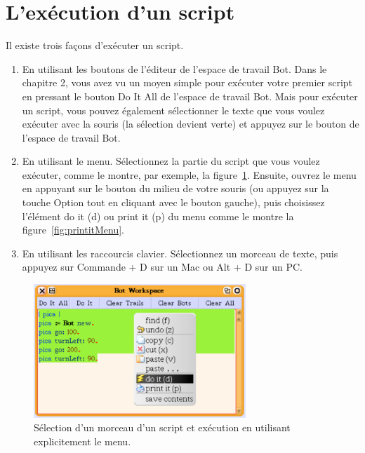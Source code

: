 \documentclass[a4paper,10pt,twoside]{book}
\begin{document}
\section{L'ex\'ecution d'un script }
Il existe trois fa\c cons d'ex\'ecuter un script.  

\begin{enumerate}
\item En utilisant les boutons de l'\'editeur de l'espace de travail Bot. Dans le chapitre 2, vous avez vu un moyen simple pour ex\'ecuter votre premier script en pressant le bouton Do It All de l'espace de travail Bot. Mais pour ex\'ecuter un script, vous pouvez \'egalement s\'electionner le texte que vous voulez ex\'ecuter avec la souris (la s\'election devient verte) et appuyez sur le bouton  de l'espace de travail Bot. 

\item En utilisant le menu. S\'electionnez la partie du script que vous voulez ex\'ecuter, comme le montre, par exemple, la figure~\ref{fig:doitMenu}. Ensuite, ouvrez le menu en appuyant sur le bouton du milieu de votre souris (ou appuyez sur la touche Option  tout en cliquant avec le bouton gauche), puis choisissez l'\'el\'ement do it (d) ou print it (p) du menu comme le montre la figure~\ref{fig:printitMenu}.

\item En utilisant les raccourcis clavier. S\'electionnez un morceau de texte, puis appuyez sur Commande + D sur un Mac ou Alt + D sur un PC. 

\end{enumerate}

\begin{figure}[h]
\begin{center}
\includegraphics[width=8cm]{doitViaMenu}
\caption{S\'election d'un morceau d'un script et ex\'ecution en utilisant explicitement le menu.\label{fig:doitMenu}}
\end{center}
\end{figure}
\end{document}

